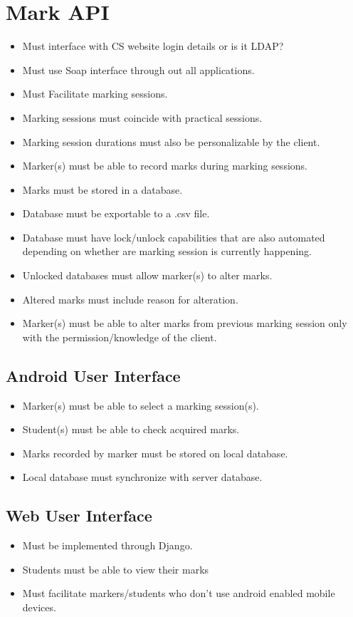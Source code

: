 \documentclass[10pt,a4paper]{article}
\begin{document}
	\section*{Mark API}
	\begin{itemize}
		\item Must interface with CS website login details or is it LDAP?
		\item Must use Soap interface through out all applications.
		\item Must Facilitate marking sessions.
		\item Marking sessions must coincide with practical sessions.
		\item Marking session durations must also be personalizable by the client.
		\item Marker(s) must be able to record marks during marking sessions.
		\item Marks must be stored in a database.
		\item Database must be exportable to a .csv file.
		\item Database must have lock/unlock capabilities that are also automated depending on whether are marking session is currently happening.
		\item Unlocked databases must allow marker(s) to alter marks.
		\item Altered marks must include reason for alteration.
		\item Marker(s) must be able to alter marks from previous marking session only with the permission/knowledge of the client.
	\end{itemize}
	\subsection*{Android User Interface}
	\begin{itemize}
		\item Marker(s) must be able to select a marking session(s).
		\item Student(s) must be able to check acquired marks.
		\item Marks recorded by marker must be stored on local database.
		\item Local database must synchronize with server database.
	\end{itemize}
	\subsection*{Web User Interface}
	\begin{itemize}
		\item Must be implemented through Django.
  		\item Students must be able to view their marks
  		\item Must facilitate markers/students who don't use android enabled mobile devices.
	\end{itemize}
\end{document}

